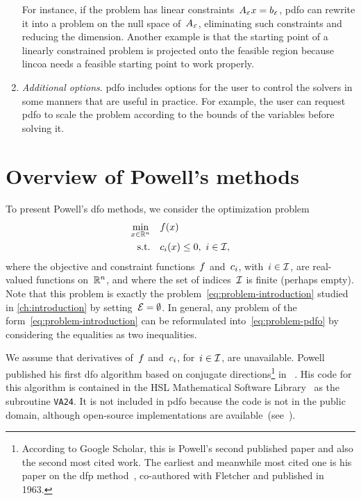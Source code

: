 \begin{enumerate}
    For instance, if the problem has linear constraints~$A_{\scriptscriptstyle\ieq} \iter = b_{\scriptscriptstyle\ieq}$, \gls{pdfo} can rewrite it into a problem on the null space of~$A_{\scriptscriptstyle\mathcal{E}}$, eliminating such constraints and reducing the dimension.
    Another example is that the starting point of a linearly constrained problem is projected onto the feasible region because \gls{lincoa} needs a feasible starting point to work properly.
    \item \emph{Additional options}.
    \gls{pdfo} includes options for the user to control the solvers in some manners that are useful in practice.
    For example, the user can request \gls{pdfo} to scale the problem according to the bounds of the variables before solving it.
\end{enumerate}

\section{Overview of Powell's  methods}
\label{sec:powell}

To present Powell's \gls{dfo} methods, we consider the optimization problem
\begin{subequations}
    \label{eq:problem-pdfo}
    \begin{align}
        \min_{\iter \in \R^n}   & \quad \obj(\iter)\\
        \text{s.t.}             & \quad \con{i}(\iter) \le 0, ~ i \in \iub,
    \end{align}
\end{subequations}
where the objective and constraint functions~$f$ and~$c_{i}$, with~$i \in \mathcal{I}$, are real-valued functions on~$\mathbb{R}^n$, and where the set of indices~$\mathcal{I}$ is finite (perhaps empty).
Note that this problem is exactly the problem~\cref{eq:problem-introduction} studied in \cref{ch:introduction} by setting~$\mathcal{E} = \emptyset$.
In general, any problem of the form~\cref{eq:problem-introduction} can be reformulated into~\cref{eq:problem-pdfo} by considering the equalities as two inequalities.

We assume that derivatives of~$f$ and~$c_{i}$, for~$i \in \mathcal{I}$, are unavailable.
Powell published his first \gls{dfo} algorithm based on conjugate directions\footnote{According to Google Scholar, this is Powell's second published paper and also the second most cited work. The earliest and meanwhile most cited one is his paper on the \gls{dfp} method~\cite{Fletcher_Powell_1963}, co-authored with Fletcher and published in 1963.} in \citeyear{Powell_1964}~\cite{Powell_1964}.
His code for this algorithm is contained in the HSL Mathematical Software Library~\cite{HSL} as the subroutine \texttt{VA24}.
It is not included in \gls{pdfo} because the code is not in the public domain, although open-source implementations are available~(see~\cite[Fn.~4]{Conn_Scheinberg_Toint_1997b}).

